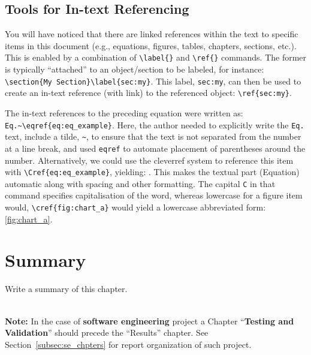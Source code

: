 \subsection{Tools for In-text Referencing}\label{subsec:reftools}
You will have noticed that there are linked references within the text to specific items in this document (e.g., equations, figures, tables, chapters, sections, etc.).  This is enabled by a combination of \verb|\label{}| and \verb|\ref{}| commands.  The former is typically ``attached'' to an object/section to be labeled, for instance: \lstinline!\section{My Section}\label{sec:my}!.  This label, \verb|sec:my|, can then be used to create an in-text reference (with link) to the referenced object: \verb|\ref{sec:my}|.

The in-text references to the preceding equation were written as: \lstinline!Eq.~\eqref{eq:eq_example}!.  Here, the author needed to explicitly write the \verb|Eq.| text, include a tilde, \verb|~|, to ensure that the text is not separated from the number at a line break, and used \verb|eqref| to automate placement of parentheses around the number.  Alternatively, we could use the cleverref system to reference this item with \verb|\Cref{eq:eq_example}|, yielding: .  This makes the textual part (Equation) automatic along with spacing and other formatting.  The capital \verb|C| in that command specifies capitalisation of the word, whereas lowercase for a figure item would, \verb|\cref{fig:chart_a}| would yield a lowercase abbreviated form: \cref{fig:chart_a}.

\section{Summary}
Write a summary of this chapter.

~\\[5em]
\noindent
{\huge\textbf{Note:}} In the case of \textbf{software engineering} project a Chapter ``\textbf{Testing and Validation}'' should precede the ``Results'' chapter. See Section~\ref{subsec:se_chpters} for report organization of such project. 

